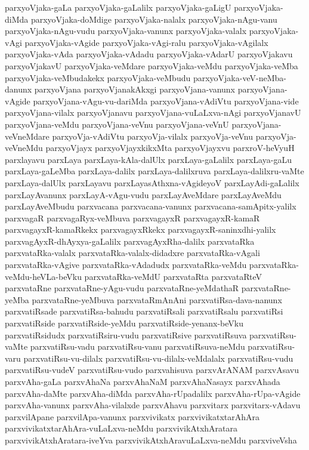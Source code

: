 {parxyoVjaka-gaLa
parxyoVjaka-gaLalilx
parxyoVjaka-gaLigU
parxyoVjaka-diMda
parxyoVjaka-doMdige
parxyoVjaka-nalalx
parxyoVjaka-nAgu-vanu
parxyoVjaka-nAgu-vudu
parxyoVjaka-vanunx
parxyoVjaka-valalx
parxyoVjaka-vAgi
parxyoVjaka-vAgide
parxyoVjaka-vAgi-ralu
parxyoVjaka-vAgilalx
parxyoVjaka-vAda
parxyoVjaka-vAdadu
parxyoVjaka-vAdarU
parxyoVjakavu
parxyoVjakavU
parxyoVjaka-veMdare
parxyoVjaka-veMdu
parxyoVjaka-veMba
parxyoVjaka-veMbudakekx
parxyoVjaka-veMbudu
parxyoVjaka-veV-neMba-danunx
parxyoVjana
parxyoVjanakAkxgi
parxyoVjana-vanunx
parxyoVjana-vAgide
parxyoVjana-vAgu-vu-dariMda
parxyoVjana-vAdiVtu
parxyoVjana-vide
parxyoVjana-vilalx
parxyoVjanavu
parxyoVjana-vuLaLxva-nAgi
parxyoVjanavU
parxyoVjana-veMdu
parxyoVjana-veVnu
parxyoVjana-veVnU
parxyoVjana-veVneMdare
parxyoVja-vAdiVtu
parxyoVja-vilalx
parxyoVja-veVnu
parxyoVja-veVneMdu
parxyoVjayx
parxyoVjayxkikxMta
parxyoVjayxvu
parxroV-heVyuH
parxlayavu
parxLaya
parxLaya-kAla-dalUlx
parxLaya-gaLalilx
parxLaya-gaLu
parxLaya-gaLeMba
parxLaya-dalilx
parxLaya-dalilxruva
parxLaya-dalilxru-vaMte
parxLaya-dalUlx
parxLayavu
parxLayasAthxna-vAgideyoV
parxLayAdi-gaLalilx
parxLayAvanunx
parxLayA-vAgu-vudu
parxLayAveMdare
parxLayAveMdu
parxLayAveMbudu
parxvacana
parxvacana-vanunx
parxvacana-samApitx-yalilx
parxvagaR
parxvagaRyx-veMbuva
parxvagayxR
parxvagayxR-kamaR
parxvagayxR-kamaRkekx
parxvagayxRkekx
parxvagayxR-saninxdhi-yalilx
parxvagAyxR-dhAyxya-gaLalilx
parxvagAyxRha-dalilx
parxvataRka
parxvataRka-valalx
parxvataRka-valalx-didadxre
parxvataRka-vAgali
parxvataRka-vAgive
parxvataRka-vAdadudx
parxvataRka-veMdu
parxvataRka-veMdu-heVLa-beVku
parxvataRka-veMdU
parxvataRta
parxvataRteV
parxvataRne
parxvataRne-yAgu-vudu
parxvataRne-yeMdathaR
parxvataRne-yeMba
parxvataRne-yeMbuva
parxvataRmAnAni
parxvatiRsa-dava-nanunx
parxvatiRsade
parxvatiRsa-bahudu
parxvatiRsali
parxvatiRsalu
parxvatiRsi
parxvatiRside
parxvatiRside-yeMdu
parxvatiRside-yenanx-beVku
parxvatiRsidudx
parxvatiRsiru-vudu
parxvatiRsive
parxvatiRsuva
parxvatiRsu-vaMte
parxvatiRsu-vadu
parxvatiRsu-vanu
parxvatiRsuva-neMdu
parxvatiRsu-varu
parxvatiRsu-vu-dilalx
parxvatiRsu-vu-dilalx-veMdalalx
parxvatiRsu-vudu
parxvatiRsu-vudeV
parxvatiRsu-vudo
parxvahisuva
parxvArANAM
parxvAsavu
parxvAha-gaLa
parxvAhaNa
parxvAhaNaM
parxvAhaNasayx
parxvAhada
parxvAha-daMte
parxvAha-diMda
parxvAha-rUpadalilx
parxvAha-rUpa-vAgide
parxvAha-vanunx
parxvAha-vilalxde
parxvAhavu
parxvitarx
parxvitarx-vAdavu
parxvilApane
parxvilApa-vanunx
parxvivikatx
parxvivikatxtarAhAra
parxvivikatxtarAhAra-vuLaLxva-neMdu
parxvivikAtxhAratara
parxvivikAtxhAratara-iveYva
parxvivikAtxhAravuLaLxva-neMdu
parxviveVsha
}

